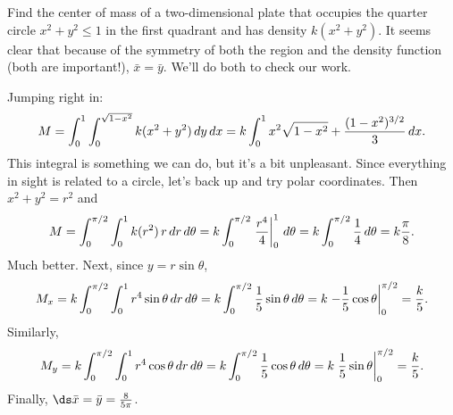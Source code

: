 \begin{example} Find the center of mass of a two-dimensional plate 
that occupies the quarter circle $x^2+y^2\le1$ in the
first quadrant and has density
$k(x^2+y^2)$. It seems clear that because of the symmetry of both the
region and the density function (both are important!), $\bar x=\bar
y$. We'll do both to check our work.

Jumping right in:
$$
M=\int_0^1 \int_0^{\sqrt{1-x^2}} k(x^2+y^2)\,dy\,dx
=k\int_0^1 x^2\sqrt{1-x^2}+{(1-x^2)^{3/2}\over3}\,dx.
$$
This integral is something we can do, but it's a bit unpleasant. Since
everything in sight is related to a circle, let's back up and try
polar coordinates. Then $x^2+y^2=r^2$ and
$$M=\int_0^{\pi/2} \int_0^{1} k(r^2)\,r\,dr\,d\theta
=k\int_0^{\pi/2}\left.{r^4\over4}\right|_0^1\,d\theta
=k\int_0^{\pi/2} {1\over4}\,d\theta
=k{\pi\over8}.
$$
Much better. Next, since $y=r\sin\theta$,
$$M_x=k\int_0^{\pi/2} \int_0^{1} r^4\sin\theta\,dr\,d\theta
=k\int_0^{\pi/2} {1\over5}\sin\theta\,d\theta
=k\left.-{1\over5}\cos\theta\right|_0^{\pi/2}={k\over5}.
$$
Similarly,
$$M_y=k\int_0^{\pi/2} \int_0^{1} r^4\cos\theta\,dr\,d\theta
=k\int_0^{\pi/2} {1\over5}\cos\theta\,d\theta
=k\left.{1\over5}\sin\theta\right|_0^{\pi/2}={k\over5}.
$$
Finally, $\ds\bar x = \bar y = {8\over5\pi}$.
\end{example}

